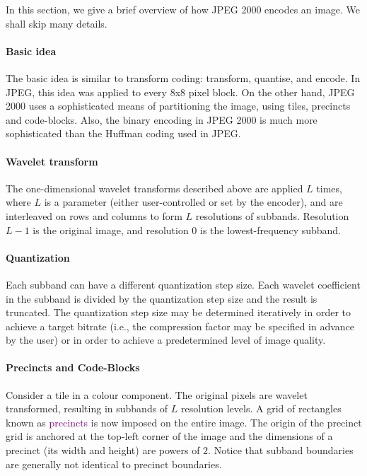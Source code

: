 \documentclass[a4paper, 11pt, openany]{book}
\numberwithin{equation}{section}
\theoremstyle{plain}
\theoremstyle{definition}
\newcommand{\Define}[1]{\textcolor{purple}{#1}}
\begin{document}
In this section, we give a brief overview of how JPEG 2000 encodes an image. We shall skip many details.

\paragraph{Basic idea} 
The basic idea is similar to transform coding: transform, quantise, and encode. In JPEG, this idea was applied to every 8x8 pixel block. On the other hand, JPEG 2000 uses a sophisticated means of partitioning the image, using tiles, precincts and code-blocks. Also, the binary encoding in JPEG 2000 is much more sophisticated than the Huffman coding used in JPEG.

\paragraph{Wavelet transform}
The one-dimensional wavelet transforms described above are applied $L$ times, where $L$ is a parameter (either user-controlled or set by the encoder), and are interleaved on rows and columns to form $L$ resolutions of subbands. Resolution $L - 1$ is the original image, and resolution $0$ is the lowest-frequency subband.

\paragraph{Quantization}
Each subband can have a different quantization step size. Each
wavelet coefficient in the subband is divided by the quantization step size and the result is truncated. The quantization step size may be determined iteratively in order to achieve a target bitrate (i.e., the compression factor may be specified in advance by the user) or in order to achieve a predetermined level of image quality.

\paragraph{Precincts and Code-Blocks}

Consider a tile in a colour component. The original pixels are wavelet transformed, resulting in subbands of $L$ resolution levels. A grid of rectangles known as \Define{precincts} is now imposed on the entire image. The origin of the precinct grid is anchored at the top-left corner of the image and the dimensions of a precinct (its width and height) are powers of $2$. Notice that subband boundaries are generally not identical to precinct boundaries. 
\end{document}
